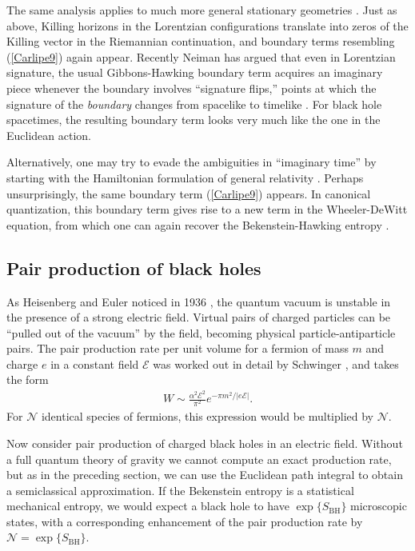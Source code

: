 \documentclass[11pt]{article}
\begin{document}
The same analysis applies to much more general stationary geometries 
\cite{HawkingHunter}.  Just as above, Killing horizons in the Lorentzian 
configurations translate into zeros of the Killing vector in the Riemannian 
continuation, and boundary terms resembling (\ref{Carlipe9}) again appear.   
Recently Neiman has argued that even in Lorentzian signature,
the usual Gibbons-Hawking boundary term acquires an imaginary 
piece whenever the boundary involves ``signature flips,'' 
points at which the signature of the \emph{boundary} changes 
from spacelike to timelike \cite{Neiman}.  For 
black hole spacetimes, the resulting boundary term looks very 
much like the one in the Euclidean action.
 
Alternatively, one may try to evade the ambiguities in ``imaginary 
time'' by starting with the Hamiltonian formulation of general relativity 
\cite{Teitelboim}.   Perhaps unsurprisingly, the same boundary term
(\ref{Carlipe9}) appears.  In canonical quantization, this boundary term  
gives rise to a new term in the Wheeler-DeWitt equation, from which 
one can again recover the Bekenstein-Hawking entropy \cite{CarTeit}.

\subsection{Pair production of black holes}

As Heisenberg and Euler noticed in 1936 \cite{Heisenberg}, the quantum
vacuum is unstable in the presence of a strong electric field.  Virtual 
pairs of charged particles can be ``pulled out of the vacuum'' by the
field, becoming physical particle-antiparticle pairs.  The pair production
rate per unit volume for a fermion of mass $m$ and charge $e$ in a 
constant field $\mathcal{E}$ was worked out in detail by Schwinger 
\cite{Schwinger}, and takes the form
\begin{align*}
W \sim \frac{\alpha^2\mathcal{E}^2}{\pi^2} e^{- \pi m^2/|e\mathcal{E}|}  .
\end{align*}
For $\mathcal{N}$ identical species of fermions, this expression would be
multiplied by $\mathcal{N}$.

Now consider pair production of charged black holes in an electric field.  
Without a full quantum theory of gravity we cannot compute an exact 
production rate, but as in the preceding section, we can use the
Euclidean path integral  to obtain a semiclassical approximation.  
If the Bekenstein entropy is a statistical mechanical entropy, we would 
expect a black hole to have $\exp\{S_{\scriptscriptstyle\mathrm{BH}}\}$
microscopic states, with a corresponding enhancement of the pair
production rate by $\mathcal{N} = \exp \{S_{\scriptscriptstyle\mathrm{BH}}\}$.
\end{document}
